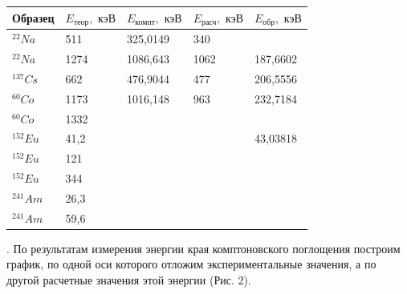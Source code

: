\documentclass[a4paper,12pt]{article} %
\begin{document}
\begin{table}[h!]
\begin{tabular}{|l|l|l|l|l|}
\hline
Образец    & $E_{\text{теор}}, \text{ кэВ}$ & $E_\text{компт}, \text{ кэВ}$ & $E_\text{расч}, \text{ кэВ}$ & $E_\text{обр}, \text{ кэВ}$ \\ \hline
$^{22}Na$  & 511                            & 325,0149                      & 340                          &                             \\ \hline
$^{22}Na$  & 1274                           & 1086,643                      & 1062                         & 187,6602                    \\ \hline
$^{137}Cs$ & 662                            & 476,9044                      & 477                          & 206,5556                    \\ \hline
$^{60}Co$  & 1173                           & 1016,148                      & 963                          & 232,7184                    \\ \hline
$^{60}Co$  & 1332                           &                               &                              &                             \\ \hline
$^{152}Eu$ & 41,2                           &                               &                              & 43,03818                    \\ \hline
$^{152}Eu$ & 121                            &                               &                              &                             \\ \hline
$^{152}Eu$ & 344                            &                               &                              &                             \\ \hline
$^{241}Am$ & 26,3                           &                               &                              &                             \\ \hline
$^{241}Am$ & 59,6                           &                               &                              &                             \\ \hline
\end{tabular}
\end{table}

. По результатам измерения энергии края комптоновского поглощения построим график, по одной оси которого отложим экспериментальные значения, а по другой расчетные значения этой энергии (Рис. 2).
\end{document}
